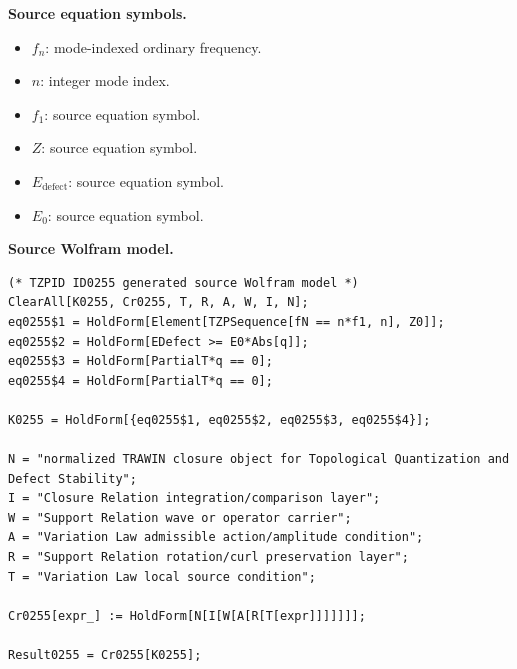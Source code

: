\begin{minipage}[t]{0.49\linewidth}
\begingroup
\small
\raggedright
\textbf{Source equation symbols.}\par
\begin{itemize}[leftmargin=1.35em,itemsep=1pt,topsep=1pt,parsep=0pt]
    \item $f_{n}$: mode-indexed ordinary frequency.
    \item $n$: integer mode index.
    \item $f_{1}$: source equation symbol.
    \item $Z$: source equation symbol.
    \item $E_{\mathrm{defect}}$: source equation symbol.
    \item $E_0$: source equation symbol.
\end{itemize}
\endgroup
\end{minipage}\hfill
\begin{minipage}[t]{0.47\linewidth}
\begingroup
\scriptsize
\raggedright
\textbf{Source Wolfram model.}\par
\begin{Verbatim}[fontsize=\tiny,breaklines=true,breakanywhere=true]
(* TZPID ID0255 generated source Wolfram model *)
ClearAll[K0255, Cr0255, T, R, A, W, I, N];
eq0255$1 = HoldForm[Element[TZPSequence[fN == n*f1, n], Z0]];
eq0255$2 = HoldForm[EDefect >= E0*Abs[q]];
eq0255$3 = HoldForm[PartialT*q == 0];
eq0255$4 = HoldForm[PartialT*q == 0];

K0255 = HoldForm[{eq0255$1, eq0255$2, eq0255$3, eq0255$4}];

N = "normalized TRAWIN closure object for Topological Quantization and Defect Stability";
I = "Closure Relation integration/comparison layer";
W = "Support Relation wave or operator carrier";
A = "Variation Law admissible action/amplitude condition";
R = "Support Relation rotation/curl preservation layer";
T = "Variation Law local source condition";

Cr0255[expr_] := HoldForm[N[I[W[A[R[T[expr]]]]]]];

Result0255 = Cr0255[K0255];
\end{Verbatim}
\endgroup
\end{minipage}

